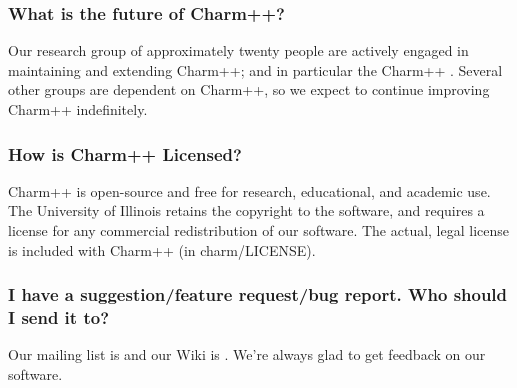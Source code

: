 \subsubsection{What is the future of Charm++?}

Our research group of approximately twenty people are actively engaged
in maintaining and extending Charm++; and in particular the Charm++ 
.
Several other groups are dependent on Charm++, so we expect to continue
improving Charm++ indefinitely.

\subsubsection{How is Charm++ Licensed?}

Charm++ is open-source and free for research, educational, and academic
use. The University of Illinois retains the copyright to the software,
and requires a license for any commercial redistribution of our software.
The actual, legal license is included with Charm++ (in charm/LICENSE).

\subsubsection{I have a suggestion/feature request/bug report. Who should I send
it to?}

Our mailing list is  and our Wiki is .
We're always glad to get feedback on our software.
